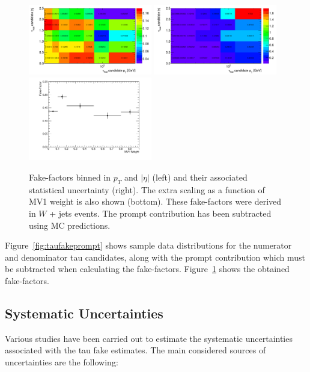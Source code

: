 \begin{figure}
\centering \includegraphics[width=0.48\textwidth]{figures/backgrounds/TauFakes_FFPt}
\centering \includegraphics[width=0.48\textwidth]{figures/backgrounds/TauFakes_FFEta}
\centering \includegraphics[width=0.48\textwidth]{figures/backgrounds/TauFakes_FFMV1}
\caption{\label{fig:taufakefactors} Fake-factors binned in $p_{T}$ and $|\eta|$ (left) and
  their associated statistical uncertainty (right). The extra scaling as a function of MV1
  weight is also shown (bottom).  These fake-factors were derived in $W$ + jets
  events. The prompt contribution has been subtracted using MC predictions.}
\end{figure}

Figure~\ref{fig:taufakeprompt} shows sample data distributions for the numerator and
denominator tau candidates, along with the prompt contribution which must be subtracted
when calculating the fake-factors. Figure~\ref{fig:taufakefactors} shows the obtained
fake-factors.

\subsection{Systematic Uncertainties}\label{sec:ff-tau-systematics}

Various studies have been carried out to estimate the systematic uncertainties associated
with the tau fake estimates.  The main considered sources of uncertainties are the following:

